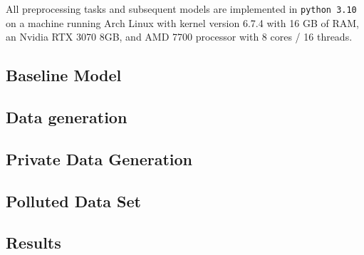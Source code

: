 All preprocessing tasks and subsequent models are implemented in \texttt{python 3.10} on a machine running Arch Linux with kernel version 6.7.4 with 16 GB of RAM, an Nvidia RTX 3070 8GB, and AMD 7700 processor with 8 cores / 16 threads.

\subsection{Baseline Model}

\subsection{Data generation}

\subsection{Private Data Generation}

\subsection{Polluted Data Set}

\subsection{Results}